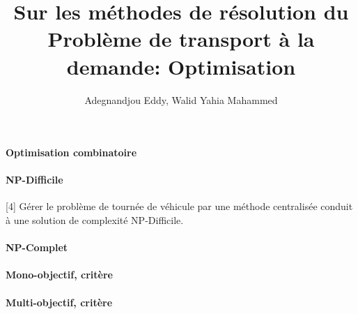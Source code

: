 \documentclass{article}
\begin{document}
\title{Sur les méthodes de résolution du Problème de transport à la demande: Optimisation}
\author{Adegnandjou Eddy, Walid Yahia Mahammed}

\maketitle

\newpage

\paragraph{Optimisation combinatoire}

\paragraph{NP-Difficile}
[4] Gérer le problème de tournée de véhicule par une méthode centralisée conduit à une solution de complexité NP-Difficile.

\paragraph{NP-Complet}

\paragraph{Mono-objectif, critère}

\paragraph{Multi-objectif, critère}
\end{document}
